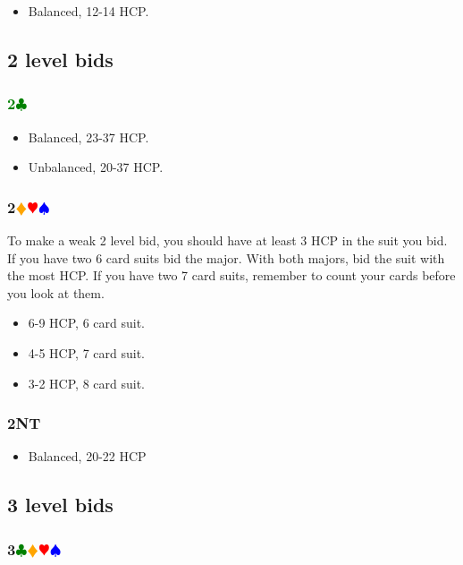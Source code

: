 \documentclass{article}
\newcommand{\Hs}{\textcolor{Red}{$\varheart$}}
\newcommand{\Ss}{\textcolor{Blue}{$\spadesuit$}}
\newcommand{\Ds}{\textcolor{Orange}{$\vardiamond$}}
\newcommand{\Cs}{\textcolor{Green}{$\clubsuit$}}
\newcommand{\NTs}{\textbf{\footnotesize{NT}}}
\newcommand{\C}[1]{\textcolor{Green}{\textbf{#1}\Cs}}
\newcommand{\NT}[1]{\textbf{#1\NTs}}
\newcommand{\suits}[1]{\textbf{#1}\Cs\Ds\Hs\Ss}
\newcommand{\notclubs}[1]{\textbf{#1}\Ds\Hs\Ss}
\begin{document}
\begin{itemize}
\item Balanced, 12-14 HCP.
\end{itemize}

\subsection{2 level bids}

\subsubsection{\C{2}}

\begin{itemize}
\item Balanced, 23-37 HCP.
\item Unbalanced, 20-37 HCP.
\end{itemize}

\subsubsection{\notclubs{2}}

To make a weak 2 level bid, you should have at least 3 HCP in the suit you bid. If you have two 6 card suits bid the major. With both majors, bid the suit with the most HCP. If you have two 7 card suits, remember to count your cards before you look at them.

\begin{itemize}
\item 6-9 HCP, 6 card suit.
\item 4-5 HCP, 7 card suit.
\item 3-2 HCP, 8 card suit.
\end{itemize}

\subsubsection{\NT{2}}

\begin{itemize}
\item Balanced, 20-22 HCP
\end{itemize}

\subsection{3 level bids}

\subsubsection{\suits{3}}
\end{document}
